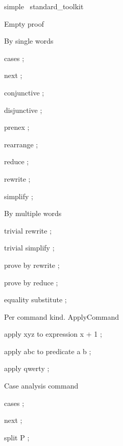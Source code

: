\begin{zsection}	 \SECTION simple \parents~standard\_toolkit
\end{zsection}



Empty proof

\begin{zproof}[emptyProof]


\end{zproof}



By single words

\begin{zproof}[singleWord]

 cases ;
 
 next ;
 
 conjunctive ;
 
 disjunctive ;
 
 prenex ;
 
 rearrange ;
 
 reduce ;
 
 rewrite ;
 
 simplify ;
 

\end{zproof}



By multiple words

\begin{zproof}[multipleWords]

 trivial rewrite ;
 
 trivial simplify ;
 
 prove by rewrite ;
 
 prove by reduce ;
 
 equality substitute ;
 

\end{zproof}



Per command kind. ApplyCommand

\begin{zproof}[applyWordComplex]

 apply xyz to expression x + 1 ;
 
 apply abc to predicate a \in b ;
 
 apply qwerty ;
 

\end{zproof}



Case analysis command

\begin{zproof}[caseAnalysisCmd]

 cases ;
 
 next ;
 
 split P ;
 

\end{zproof}



